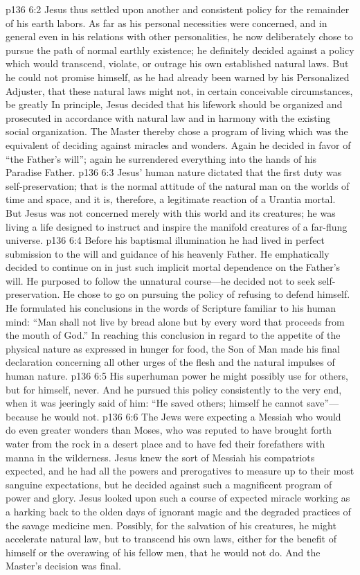 \vs p136 6:2 Jesus thus settled upon another and consistent policy for the remainder of his earth labors. As far as his personal necessities were concerned, and in general even in his relations with other personalities, he now deliberately chose to pursue the path of normal earthly existence; he definitely decided against a policy which would transcend, violate, or outrage his own established natural laws. But he could not promise himself, as he had already been warned by his Personalized Adjuster, that these natural laws might not, in certain conceivable circumstances, be greatly  In principle, Jesus decided that his lifework should be organized and prosecuted in accordance with natural law and in harmony with the existing social organization. The Master thereby chose a program of living which was the equivalent of deciding against miracles and wonders. Again he decided in favor of “the Father’s will”; again he surrendered everything into the hands of his Paradise Father.
\vs p136 6:3 Jesus’ human nature dictated that the first duty was self\hyp{}preservation; that is the normal attitude of the natural man on the worlds of time and space, and it is, therefore, a legitimate reaction of a Urantia mortal. But Jesus was not concerned merely with this world and its creatures; he was living a life designed to instruct and inspire the manifold creatures of a far\hyp{}flung universe.
\vs p136 6:4 Before his baptismal illumination he had lived in perfect submission to the will and guidance of his heavenly Father. He emphatically decided to continue on in just such implicit mortal dependence on the Father’s will. He purposed to follow the unnatural course---he decided not to seek self\hyp{}preservation. He chose to go on pursuing the policy of refusing to defend himself. He formulated his conclusions in the words of Scripture familiar to his human mind: “Man shall not live by bread alone but by every word that proceeds from the mouth of God.” In reaching this conclusion in regard to the appetite of the physical nature as expressed in hunger for food, the Son of Man made his final declaration concerning all other urges of the flesh and the natural impulses of human nature.\plusone
\vs p136 6:5 His superhuman power he might possibly use for others, but for himself, never. And he pursued this policy consistently to the very end, when it was jeeringly said of him: “He saved others; himself he cannot save”---because he would not.
\vs p136 6:6 The Jews were expecting a Messiah who would do even greater wonders than Moses, who was reputed to have brought forth water from the rock in a desert place and to have fed their forefathers with manna in the wilderness. Jesus knew the sort of Messiah his compatriots expected, and he had all the powers and prerogatives to measure up to their most sanguine expectations, but he decided against such a magnificent program of power and glory. Jesus looked upon such a course of expected miracle working as a harking back to the olden days of ignorant magic and the degraded practices of the savage medicine men. Possibly, for the salvation of his creatures, he might accelerate natural law, but to transcend his own laws, either for the benefit of himself or the overawing of his fellow men, that he would not do. And the Master’s decision was final.

